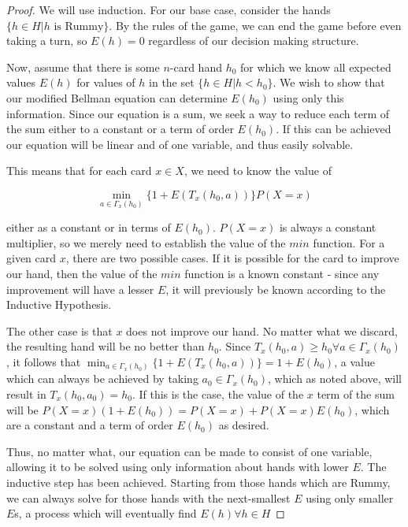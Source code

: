 \documentclass[paper=a4, fontsize=11pt,twoside]{report}   %
\begin{document}
\begin{proof}
We will use induction. For our base case, consider the hands $\{h \in H | h \textrm{ is Rummy}\}$. By the rules of the game, we can end the game before even taking a turn, so $E(h) = 0$ regardless of our decision making structure.

Now, assume that there is some $n$-card hand $h_0$ for which we know all expected values $E(h)$ for values of $h$ in the set $\{h \in H | h < h_0\}$. We wish to show that our modified Bellman equation can determine $E(h_0)$ using only this information. Since our equation is a sum, we seek a way to reduce each term of the sum either to a constant or a term of order $E(h_0)$. If this can be achieved our equation will be linear and of one variable, and thus easily solvable.

This means that for each card $x \in X$, we need to know the value of 

$$\min_{a \in \Gamma_x (h_0)}\{1+E(T_x(h_0,a))\} P(X=x)$$

either as a constant or in terms of $E(h_0)$. $P(X=x)$ is always a constant multiplier, so we merely need to establish the value of the $min$ function. For a given card $x$, there are two possible cases. If it is possible for the card to improve our hand, then the value of the $min$ function is a known constant - since any improvement will have a lesser $E$, it will previously be known according to the Inductive Hypothesis.

The other case is that $x$ does not improve our hand. No matter what we discard, the resulting hand will be no better than $h_0$. Since $T_x(h_0,a) \geq h_0 \forall a \in \Gamma_x (h_0)$, it follows that $\min_{a \in \Gamma_x (h_0)}\{1+E(T_x(h_0,a))\} = 1 + E(h_0)$, a value which can always be achieved by taking $a_0 \in  \Gamma_x (h_0)$, which as noted above, will result in $T_x(h_0,a_0)=h_0$. If this is the case, the value of the $x$ term of the sum will be $P(X=x)(1+E(h_0)) = P(X=x) + P(X=x)E(h_0)$, which are a constant and a term of order $E(h_0)$ as desired.

Thus, no matter what, our equation can be made to consist of one variable, allowing it to be solved using only information about hands with lower $E$. The inductive step has been achieved. Starting from those hands which are Rummy, we can always solve for those hands with the next-smallest $E$ using only smaller $E$s, a process which will eventually find $E(h) \forall h \in H$
\end{proof}
\end{document}

